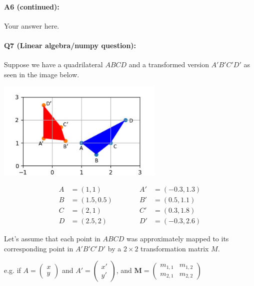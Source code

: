 
\pagebreak
\paragraph{A6 (continued):} Your answer here.


\pagebreak
\paragraph{Q7 (Linear algebra/numpy question):}
Suppose we have a quadrilateral $ABCD$ and a transformed version $A'B'C'D'$ as seen in the image below.

\includegraphics[width=8cm]{quadrilaterals.jpg}

\begin{equation}
\begin{split}
A&=(1, 1)\\
B&=(1.5, 0.5)\\
C&=(2, 1)\\
D&=(2.5, 2)
\end{split}
\quad\quad\quad
\begin{split}
A'&=(-0.3, 1.3)\\
B'&=(0.5, 1.1)\\
C'&=(0.3, 1.8)\\
D'&=(-0.3, 2.6)
\end{split}
\end{equation}

Let's assume that each point in $ABCD$ was approximately mapped to its corresponding point in $A'B'C'D'$ by a $2\times2$ transformation matrix $M$.

e.g. if $A = \begin{pmatrix} x \\ y \end{pmatrix}$ and $A' = \begin{pmatrix} x' \\ y' \end{pmatrix}$, and $\boldsymbol{M} = \begin{pmatrix} m_{1,1} & m_{1,2} \\ m_{2,1} & m_{2,2} \end{pmatrix}$

